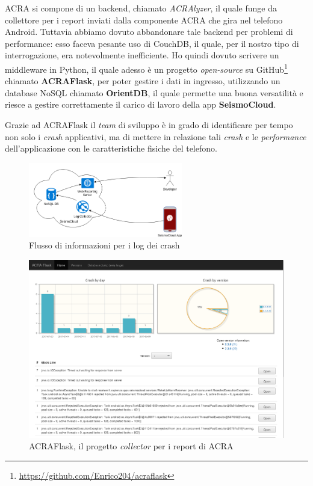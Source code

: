 \documentclass[a4paper,10pt]{memoir}
\begin{document}
ACRA si compone di un backend, chiamato \textit{ACRAlyzer}, il quale funge da collettore per i report inviati dalla componente ACRA che gira nel telefono Android. Tuttavia abbiamo dovuto abbandonare tale backend per problemi di performance: esso faceva pesante uso di CouchDB, il quale, per il nostro tipo di interrogazione, era notevolmente inefficiente. Ho quindi dovuto scrivere un middleware in Python, il quale adesso è un progetto \textit{open-source} su GitHub\footnote{\url{https://github.com/Enrico204/acraflask}} chiamato \textbf{ACRAFlask}, per poter gestire i dati in ingresso, utilizzando un database NoSQL chiamato \textbf{OrientDB}, il quale permette una buona versatilità e riesce a gestire correttamente il carico di lavoro della app \textbf{SeismoCloud}.

Grazie ad ACRAFlask il \textit{team} di sviluppo è in grado di identificare per tempo non solo i \textit{crash} applicativi, ma di mettere in relazione tali \textit{crash} e le \textit{performance} dell'applicazione con le caratteristiche fisiche del telefono.

\begin{figure}[ht]
\centering
\caption{Flusso di informazioni per i log dei crash}
\includegraphics[width=0.6\textwidth]{dev/acracollector}
\end{figure}

\begin{figure}[ht]
\centering
\caption{ACRAFlask, il progetto \textit{collector} per i report di ACRA}
\label{fig:acraflask}
\includegraphics[width=\textwidth]{dev/acraflask}
\end{figure}
\end{document}
